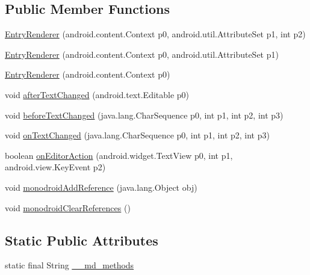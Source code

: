 \subsection*{Public Member Functions}
\begin{CompactItemize}
\item 
\hyperlink{classmd5b60ffeb829f638581ab2bb9b1a7f4f3f_1_1_entry_renderer_c9f1e77924196c3ec66c66643a42d20c}{EntryRenderer} (android.content.Context p0, android.util.AttributeSet p1, int p2)
\item 
\hyperlink{classmd5b60ffeb829f638581ab2bb9b1a7f4f3f_1_1_entry_renderer_a677f29384a087cba52a19f1109b3bb2}{EntryRenderer} (android.content.Context p0, android.util.AttributeSet p1)
\item 
\hyperlink{classmd5b60ffeb829f638581ab2bb9b1a7f4f3f_1_1_entry_renderer_dacbe769cf67a492a9904d4fe314f4f5}{EntryRenderer} (android.content.Context p0)
\item 
void \hyperlink{classmd5b60ffeb829f638581ab2bb9b1a7f4f3f_1_1_entry_renderer_bd753a7f1a81e9767e269259f1c38e25}{afterTextChanged} (android.text.Editable p0)
\item 
void \hyperlink{classmd5b60ffeb829f638581ab2bb9b1a7f4f3f_1_1_entry_renderer_17c929e5fb1379672df9b6b03f0b9cb4}{beforeTextChanged} (java.lang.CharSequence p0, int p1, int p2, int p3)
\item 
void \hyperlink{classmd5b60ffeb829f638581ab2bb9b1a7f4f3f_1_1_entry_renderer_8f550bc686abb5ee849838c8139aa969}{onTextChanged} (java.lang.CharSequence p0, int p1, int p2, int p3)
\item 
boolean \hyperlink{classmd5b60ffeb829f638581ab2bb9b1a7f4f3f_1_1_entry_renderer_099a976db3b379379d84776f7b194fed}{onEditorAction} (android.widget.TextView p0, int p1, android.view.KeyEvent p2)
\item 
void \hyperlink{classmd5b60ffeb829f638581ab2bb9b1a7f4f3f_1_1_entry_renderer_874980e2f1e04a1474a4c5ff9a052a13}{monodroidAddReference} (java.lang.Object obj)
\item 
void \hyperlink{classmd5b60ffeb829f638581ab2bb9b1a7f4f3f_1_1_entry_renderer_5ad12d956145127cb1bb040a5c2d369b}{monodroidClearReferences} ()
\end{CompactItemize}
\subsection*{Static Public Attributes}
\begin{CompactItemize}
\item 
static final String \hyperlink{classmd5b60ffeb829f638581ab2bb9b1a7f4f3f_1_1_entry_renderer_d2206e7a8e60b685459381a385bdf9f1}{\_\-\_\-md\_\-methods}
\end{CompactItemize}
